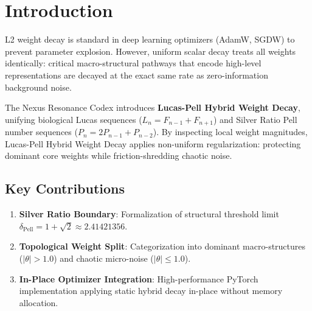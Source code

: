 \section{Introduction}
L2 weight decay is standard in deep learning optimizers (AdamW, SGDW) to prevent parameter explosion. However, uniform scalar decay treats all weights identically: critical macro-structural pathways that encode high-level representations are decayed at the exact same rate as zero-information background noise.

The Nexus Resonance Codex introduces \textbf{Lucas-Pell Hybrid Weight Decay}, unifying biological Lucas sequences ($L_n = F_{n-1} + F_{n+1}$) and Silver Ratio Pell number sequences ($P_n = 2P_{n-1} + P_{n-2}$). By inspecting local weight magnitudes, Lucas-Pell Hybrid Weight Decay applies non-uniform regularization: protecting dominant core weights while friction-shredding chaotic noise.

\subsection{Key Contributions}
\begin{enumerate}[label=\textbf{\arabic*.}]
    \item \textbf{Silver Ratio Boundary}: Formalization of structural threshold limit $\delta_{\text{Pell}} = 1 + \sqrt{2} \approx 2.41421356$.
    \item \textbf{Topological Weight Split}: Categorization into dominant macro-structures ($|\theta| > 1.0$) and chaotic micro-noise ($|\theta| \le 1.0$).
    \item \textbf{In-Place Optimizer Integration}: High-performance PyTorch implementation applying static hybrid decay in-place without memory allocation.
\end{enumerate}
